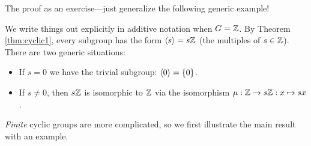 The proof as an exercise---just generalize the following generic example!

\begin{example}{}{}
	We write things out explicitly in additive notation when $G=\mathbb{Z}$. By Theorem \ref{thm:cyclic1}, every subgroup has the form $\left\langle s\right\rangle=s\mathbb{Z}$ (the multiples of $s\in\mathbb{Z}$). There are two generic situations:
	\begin{itemize}
	  \item If $s=0$ we have the trivial subgroup: $\left\langle 0\right\rangle=\{0\}$.
	  \item If $s\neq 0$, then $s\mathbb{Z}$ is isomorphic to $\mathbb{Z}$ via the isomorphism $\mu:\mathbb{Z}\to s\mathbb{Z}:x\mapsto sx$.
	\end{itemize}
\end{example}


\goodbreak


\emph{Finite} cyclic groups are more complicated, so we first illustrate the main result with an example.

